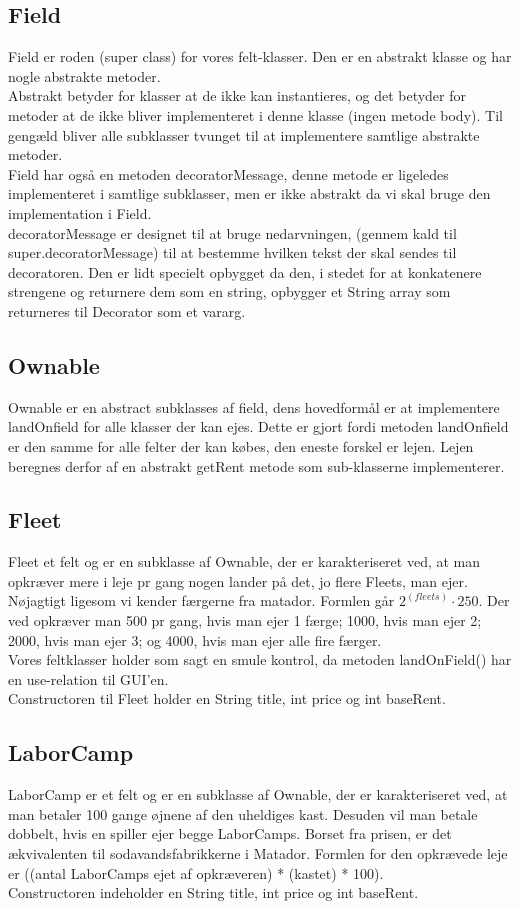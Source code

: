 \subsection*{Field}
Field er roden (super class) for vores felt-klasser. Den er en abstrakt klasse
og har nogle abstrakte metoder.\\
\indent Abstrakt betyder for klasser at de ikke kan instantieres, og det betyder
for metoder at de ikke bliver implementeret i denne klasse (ingen metode body).
Til gengæld bliver alle subklasser tvunget til at implementere samtlige
abstrakte metoder.\\
\indent Field har også en metoden decoratorMessage, denne metode er ligeledes
implementeret i samtlige subklasser, men er ikke abstrakt da vi skal bruge den
implementation i Field.\\
\indent decoratorMessage er designet til at bruge nedarvningen, (gennem kald til
super.decoratorMessage) til at bestemme hvilken tekst der skal sendes til
decoratoren. Den er lidt specielt opbygget da den, i stedet for at konkatenere
strengene og returnere dem som en string, opbygger et String array som
returneres til Decorator som et vararg.
\subsection*{Ownable}
Ownable er en abstract subklasses af field, dens hovedformål er at implementere
landOnfield for alle klasser der kan ejes. Dette er gjort fordi metoden
landOnfield er den samme for alle felter der kan købes, den eneste forskel er
lejen. Lejen beregnes derfor af en abstrakt getRent metode som sub-klasserne
implementerer.
\subsection*{Fleet}
Fleet et felt og er en subklasse af Ownable, der er karakteriseret ved, at man
opkræver mere i leje pr gang nogen lander på det, jo flere Fleets, man ejer.
Nøjagtigt ligesom vi kender færgerne fra matador. Formlen går $2^{(fleets)}
\cdot 250$. Der ved opkræver man 500 pr gang, hvis man ejer 1 færge; 1000, hvis
man ejer 2; 2000, hvis man ejer 3; og 4000, hvis man ejer alle fire færger.\\
\indent Vores feltklasser holder som sagt en smule kontrol, da metoden
landOnField() har en use-relation til GUI’en.\\
\indent Constructoren til Fleet holder en String title, int price og int
baseRent.
\subsection*{LaborCamp}
LaborCamp er et felt og er en subklasse af Ownable, der er karakteriseret ved,
at man betaler 100 gange øjnene af den uheldiges kast. Desuden vil man betale
dobbelt, hvis en spiller ejer begge LaborCamps. Borset fra prisen, er det
ækvivalenten til sodavandsfabrikkerne i Matador. Formlen for den opkrævede leje
er ((antal LaborCamps ejet af opkræveren) * (kastet) * 100).\\
\indent Constructoren indeholder en String title, int price og int baseRent.
